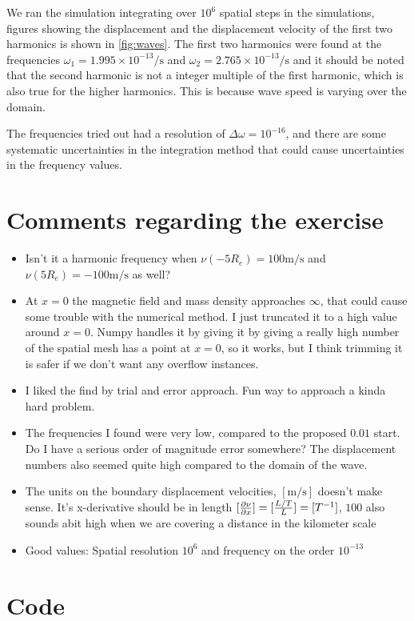 \documentclass[x11names]{article}
\begin{document}
  We ran the simulation integrating over \(10^6\) spatial steps in the simulations, figures showing the displacement and the displacement velocity of the first two harmonics is shown in \cref{fig:waves}. The first two harmonics were found at the frequencies \( \omega_1 = 1.995 \times 10^{-13} \si{\per \second} \) and \( \omega_2 = 2.765\times 10^{-13} \si{\per \second} \) and it should be noted that the second harmonic is not a integer multiple of the first harmonic, which is also true for the higher harmonics. This is because wave speed is varying over the domain.

  The frequencies tried out had a resolution of \(\Delta\omega = 10^{-16}\), and there are some systematic uncertainties in the integration method that could cause uncertainties in the frequency values.
    
      

\appendix
\section{Comments regarding the exercise}
      \begin{itemize}
        \item Isn't it a harmonic frequency when  \(\nu(-5R_e) = 100 \si{\meter\per\second}\) and \(\nu(5R_e) = -100 \si{\meter\per\second}\) as well?
        \item At \(x = 0\) the magnetic field and mass density approaches \(\infty\), that could cause some trouble with the numerical method. I just truncated it to a high value around \(x=0\).
          Numpy handles it by giving it by giving a really high number of the spatial mesh has a point at \(x=0\), so it works, but I think trimming it is safer if we don't want any overflow instances.
        \item I liked the find by trial and error approach. Fun way to approach a kinda hard problem.
        \item The frequencies I found were very low, compared to the proposed \(0.01\) start. Do I have a serious order of magnitude error somewhere? The displacement numbers also seemed quite high compared to the domain of the wave.
        \item The units on the boundary displacement velocities, \([\si{\meter\per\second}]\) doesn't make sense. It's x-derivative should be in length \([\pdv{\nu}{x}] = [\frac{L/T}{L}] = [T^{-1}]\), \(100\) also sounds abit high when we are covering a distance in the kilometer scale
        \item Good values: Spatial resolution \(10^6\) and frequency on the order \(10^{-13}\)
      \end{itemize}


\section{Code}

  \label{sec:code}
      

      
\end{document}
